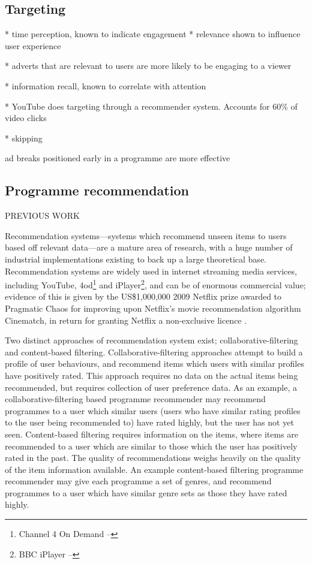 \subsection{Targeting}

	\citet{yahoo-intrusive-advertising}
	* time perception, known to indicate engagement
	* relevance shown to influence user experience

	\citet{nettelhorst2012effects}
	* adverts that are relevant to users are more likely to be engaging to a viewer

	\citep{interactions_attention_memory}
	* information recall, known to correlate with attention

	\citep{davidson2012}
	* YouTube does targeting through a recommender system. Accounts for 60\% of video clicks

	\citep{gal2006targeted}
	* skipping

	ad breaks positioned early in a programme are more effective \citep{jeong2011position}

\subsection{Programme recommendation}
	
	PREVIOUS WORK \citep{personalisedEPG}

	Recommendation systems---systems which recommend unseen items to users based off relevant data---are a mature area of research, with a huge number of industrial implementations existing to back up a large theoretical base. Recommendation systems are widely used in internet streaming media services, including YouTube, 4od\footnote{Channel 4 On Demand -- } and iPlayer\footnote{BBC iPlayer -- }, and can be of enormous commercial value; evidence of this is given by the US\$1,000,000 2009 Netflix prize awarded to Pragmatic Chaos for improving upon Netflix's movie recommendation algorithm Cinematch, in return for granting Netflix a non-exclusive licence \citep{pragmatic_chaos}.

	Two distinct approaches of recommendation system exist; collaborative-filtering and content-based filtering. Collaborative-filtering approaches attempt to build a profile of user behaviours, and recommend items which users with similar profiles have positively rated. This approach requires no data on the actual items being recommended, but requires collection of user preference data. As an example, a collaborative-filtering based programme recommender may recommend programmes to a user which similar users (users who have similar rating profiles to the user being recommended to) have rated highly, but the user has not yet seen. Content-based filtering requires information on the items, where items are recommended to a user which are similar to those which the user has positively rated in the past. The quality of recommendations weighs heavily on the quality of the item information available. An example content-based filtering programme recommender may give each programme a set of genres, and recommend programmes to a user which have similar genre sets as those they have rated highly.

